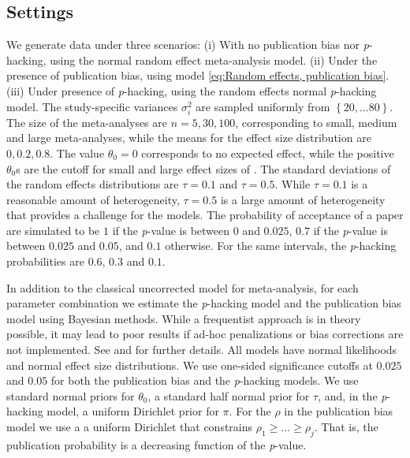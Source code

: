 \documentclass[useAMS,usenatbib,referee]{biom}
\begin{document}
\subsection{Settings}
We generate data under three scenarios: (i) With no publication bias nor \textit{p}-hacking, using the normal random effect meta-analysis model. (ii) Under the presence of publication bias, using model \eqref{eq:Random effects, publication bias}. (iii) Under presence of \textit{p}-hacking, using the random effects normal \textit{p}-hacking model. The study-specific variances $\sigma_{i}^{2}$ are sampled uniformly from $\left\{ 20,\ldots80\right\} $. The size of the meta-analyses are $n = 5, 30, 100$, corresponding to small, medium and large meta-analyses, while the means for the effect size distribution are $0, 0.2, 0.8$. The value $\theta_0 = 0$ corresponds to no expected effect, while the positive $\theta_0$s are the cutoff for small and large effect sizes of \citet[][pages 24 -- 27]{cohen1988statistical}. The standard deviations of the random effects distributions are $\tau=0.1$ and $\tau=0.5$. While $\tau = 0.1$ is a reasonable amount of heterogeneity, $\tau=0.5$ is a large amount of heterogeneity that provides a challenge for the models. The probability of acceptance of a paper are simulated to be $1$ if the \textit{p}-value is between $0$ and $0.025$, $0.7$ if the \textit{p}-value is between $0.025$ and $0.05$, and $0.1$ otherwise. For the same intervals, the \textit{p}-hacking probabilities are $0.6$, $0.3$ and $0.1$. 

In addition to the classical uncorrected model for meta-analysis, for each parameter combination we estimate the \textit{p}-hacking model and the publication bias model using Bayesian methods. While a frequentist approach is in theory possible, it may lead to poor results if ad-hoc penalizations or bias corrections are not implemented. See  \citet[Appendix, 1]{mcshane2016adjusting} and \citet{Moss2019} for further details. All models have normal likelihoods and normal effect size distributions. We use one-sided significance cutoffs at $0.025$ and $0.05$ for both the publication bias and the \textit{p}-hacking models. We use standard normal priors for $\theta_0$, a standard half normal prior for $\tau$, and, in the \textit{p}-hacking model, a uniform Dirichlet prior for $\pi$. For the $\rho$ in the publication bias model we use a a uniform Dirichlet that constrains $\rho_{1}\geq\ldots\geq\rho_{j}$. That is, the publication probability is a decreasing function of the \textit{p}-value.
\end{document}
